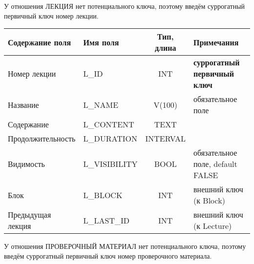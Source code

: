 \documentclass[a4paper,14pt]{article}
\begin{document}

У отношения ЛЕКЦИЯ нет потенциального ключа, поэтому введём суррогатный первичный ключ номер лекции.

\begin{table}[H]
	\begin{flushleft} 
	\end{flushleft}
\begin{adjustbox}{width=\linewidth}
	\begin{tabular}{|l|l|c|l|}
		\hline
		Содержание поля      & Имя поля      & Тип, длина & Примечания                          \\ \hline
		Номер лекции         & L\_ID         &    INT    & \textbf{суррогатный первичный ключ} \\ \hline
		Название             & L\_NAME       &   V(100)   & обязательное поле                   \\ \hline
		Содержание           & L\_CONTENT    &    TEXT    &                                     \\ \hline
		Продолжительность    & L\_DURATION   &  INTERVAL  &                                     \\ \hline
		Видимость            & L\_VISIBILITY &    BOOL    & обязательное поле, default FALSE    \\ \hline
		Блок                 & L\_BLOCK      &    INT    & внешний ключ (к Block)              \\ \hline
		Предыдущая лекция    & L\_LAST\_ID   &    INT    & внешний ключ    (к Lecture)         \\ \hline
	\end{tabular}
\end{adjustbox}
\end{table}

У отношения ПРОВЕРОЧНЫЙ МАТЕРИАЛ нет потенциального ключа, поэтому введём суррогатный первичный ключ номер проверочного материала.
\end{document}
